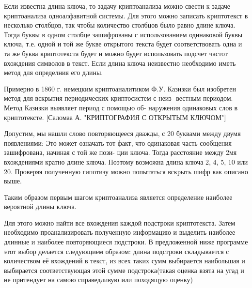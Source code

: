 \documentclass[10pt,a4paper]{article}
\begin{document}
Если известна длина ключа, то задачу криптоанализа можно свести к 
задаче криптоанализа одноалфавитной системы. Для этого можно
записать криптотекст в несколько столбцов, так чтобы количество
столбцов было равно длине ключа. Тогда буквы в одном столбце
зашифрованы с использованием одинаковой буквы ключа, т.е. одной и той
же букве открытого текста будет соответствовать одна и та же буква
криптотекста будет и можно будет использовать подсчет частот вхождения
символов в текст.
Если длина ключа неизвестно необходимо иметь метод для определния его
длины.

Примерно в 1860 г. немецким криптоаналитиком Ф.У. Казизки был
изобретен метод для вскрытия периодических криптосистем с неиз-
вестным периодом. Метод Казизки выявляет период с помощью об-
наpужения одинаковых слов в криптотексте. [Саломаа А. "КРИПТОГРАФИЯ С
ОТКРЫТЫМ КЛЮЧОМ"]

Допустим, мы нашли слово повторяющееся
дважды, с 20 буквами между двумя появлениями:
Это может означать тот факт, что
одинаковая часть сообщения зашифрована, начиная с той же пози-
ции ключа. Тогда расстояние между 2мя вхождениями кратно длине
ключа. Поэтому возможна длина ключа 2, 4, 5, 10 или 20. Проверяя 
полученную гипотизу можно попытаться вскрыть шифр как описано выше.

Таким образом первым шагом криптоанализа является определение наиболее
вероятной длины ключа.

Для этого можно найти все вхождения каждой подстроки
криптотекста. Затем необходимо проанализировать полученную информацию
и выделить наиболее длинные и наиболее повторяющиеся подстроки. В
предложенной ниже программе этот выбор делается следующием образом:
длина подстроки складывается с количеством её вхождений в текст, из
всех таких сумм выбирается наибольшая и выбирается соответствующая
этой сумме подстрока(такая оценка взята на угад и не притендует на
самою справедливую или походящую оценку)
\end{document}
